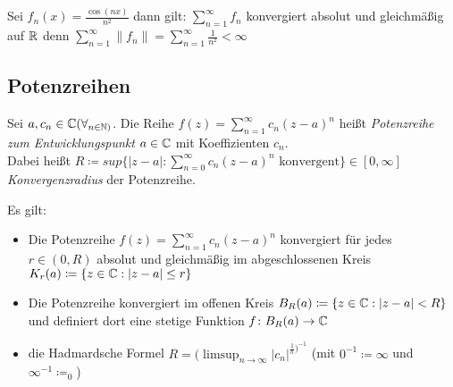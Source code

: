 \begin{example}
 Sei	$f_n(x)= \frac{\cos(nx)}{n^2}$ dann gilt: $\sum_{n=1}^{\infty}f_n$ konvergiert absolut und gleichmäßig auf $\mathbb{R}$ denn $\sum_{n=1}^{\infty} \|f_n\|= \sum_{n=1}^{\infty}	\frac{1}{n^2}<\infty$ 
\end{example}
\subsection{Potenzreihen}
\begin{definition}[Potenzreihen]
	Sei $a,c_n \in \mathbb{C} (\forall_{n \in \mathbb{N})} $. Die Reihe $f(z)=\sum_{n=1}^{\infty}c_n(z-a)^{n}$ heißt \emph{Potenzreihe zum Entwicklungspunkt $a \in \mathbb{C}$} mit Koeffizienten $c_n$. \\
	Dabei heißt $R \coloneqq sup \{|z-a| : \sum_{n=0}^{\infty}c_n(z-a)^{n} \text{ konvergent}\} \in [0,\infty]$ \emph{Konvergenzradius} der Potenzreihe.
\end{definition}
\begin{theorem}
	\label{thm:satz5}
	Es gilt:
	\begin{itemize}
		\item Die Potenzreihe $f(z) = \sum_{n=1}^{\infty}c_n(z-a)^n$ konvergiert für jedes $r \in (0,R)$ absolut und gleichmäßig im abgeschlossenen Kreis $K_r(a) \coloneqq \{z \in \mathbb{C} : |z-a| \le r\} $ 
		\item Die Potenzreihe konvergiert im offenen Kreis $B_R(a)\coloneqq \{z \in \mathbb{C} : |z-a| <R \} $ und definiert dort eine stetige Funktion $f \colon B_R(a) \to \mathbb{C} $
		\item die Hadmardsche Formel $R =(\limsup_{n \to \infty} |c_n|^{\frac{1}{n})^{-1}}$ (mit $0^{-1}\coloneqq \infty$ und $\infty^{-1}\coloneqq_0$)   
	\end{itemize}
\end{theorem}
